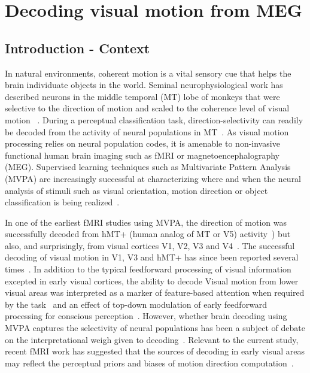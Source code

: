 
\chapter{Decoding visual motion from MEG}
\label{chapter:decoding}

\section{Introduction - Context}
In natural environments, coherent motion is a vital sensory cue that helps the brain individuate objects in the world. Seminal neurophysiological work has described neurons in the middle temporal (MT) lobe of monkeys that were selective to the direction of motion and scaled to the coherence level of visual motion~\cite{2britten1992analysis} . During a perceptual classification task, direction-selectivity can readily be decoded from the activity of neural populations in MT~\cite{3jazayeri2006optimal,4rust2006mt}. As visual motion processing relies on neural population codes, it is amenable to non-invasive functional human brain imaging such as fMRI or magnetoencephalography (MEG). Supervised learning techniques such as Multivariate Pattern Analysis (MVPA) are increasingly successful at characterizing where and when the neural analysis of stimuli such as visual orientation, motion direction or object classification is being realized~\cite{5kamitani2005decoding,6wessberg2000real,7haynes2006decoding,8poldrack2011inferring,9cichy2014resolving,10horikawa2013neural,11haynes2015primer,wardle2016perceptual,ritchie2016neural,nakamura2003human,handel2008selective,amano2006estimation}.

In one of the earliest fMRI studies using MVPA, the direction of motion was successfully decoded from hMT+ (human analog of MT or V5) activity~\cite{12beauchamp1997graded}) but also, and surprisingly, from visual cortices V1, V2, V3 and V4~\cite{13kamitani2006decoding}. The successful decoding of visual motion in V1, V3 and hMT+ has since been reported several times~\cite{5kamitani2005decoding,13kamitani2006decoding,14serences2007representation,15hogendoorn2013decoding,16van2014decoding}. In addition to the typical feedforward processing of visual information excepted in early visual cortices, the ability to decode Visual motion from lower visual areas was interpreted as a marker of  feature-based attention when required by the task~\cite{13kamitani2006decoding} and an effect of top-down modulation of early feedforward processing for conscious perception~\cite{14serences2007representation}. However, whether brain decoding using MVPA captures the selectivity of neural populations has been a subject of debate on the interpretational weigh given to decoding~\cite{11haynes2015primer,17carlson2015sensible,mostert2015dissociating,pitts2012visual}. Relevant to the current study, recent fMRI work has suggested that the sources of decoding in early visual areas may reflect the perceptual priors and biases of motion direction computation~\cite{18vintch2014cortical}.


